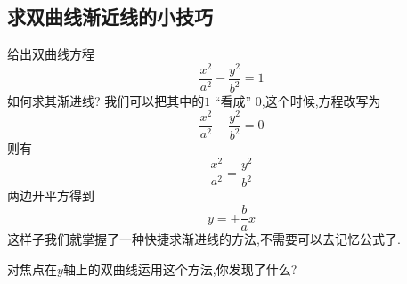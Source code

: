 \documentclass{ctexart}
\begin{document}
\subsection{求双曲线渐近线的小技巧}
给出双曲线方程
\begin{equation}
\frac{x^{2}}{a^{2}} -\frac{y^{2}}{b^{2}} =1
\end{equation}
如何求其渐进线?
我们可以把其中的$1$ “看成” $0$,这个时候,方程改写为
\begin{equation}
    \frac{x^{2}}{a^{2}} -\frac{y^{2}}{b^{2}} =0
\end{equation}
则有 
\begin{equation}
    \frac{x^{2}}{a^{2}} = \frac{y^{2}}{b^{2}} 
\end{equation}
两边开平方得到
\begin{equation}
    y =\pm \frac{b}{a} x 
\end{equation}
这样子我们就掌握了一种快捷求渐进线的方法,不需要可以去记忆公式了.

对焦点在$y$轴上的双曲线运用这个方法,你发现了什么?
\end{document}
